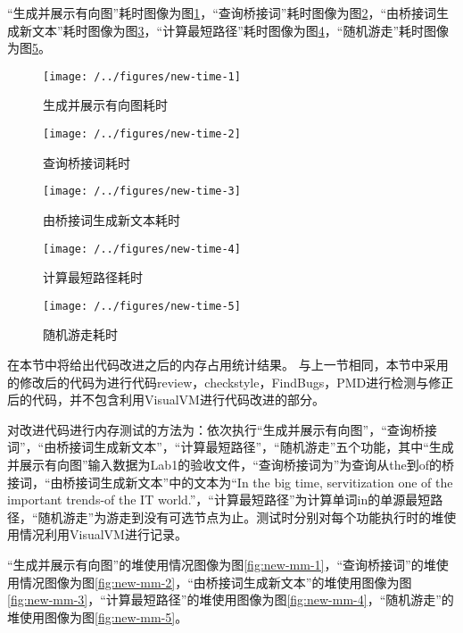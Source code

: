 “生成并展示有向图”耗时图像为图\ref{fig:new-time-1}，“查询桥接词”耗时图像为图\ref{fig:new-time-2}，“由桥接词生成新文本”耗时图像为图\ref{fig:new-time-3}，“计算最短路径”耗时图像为图\ref{fig:new-time-4}，“随机游走”耗时图像为图\ref{fig:new-time-5}。

\begin{figure}
\centering
\texttt{[image: /../figures/new-time-1]}
\caption{生成并展示有向图耗时}
\label{fig:new-time-1}
\end{figure}

\begin{figure}
\centering
\texttt{[image: /../figures/new-time-2]}
\caption{查询桥接词耗时}
\label{fig:new-time-2}
\end{figure}

\begin{figure}
\centering
\texttt{[image: /../figures/new-time-3]}
\caption{由桥接词生成新文本耗时}
\label{fig:new-time-3}
\end{figure}

\begin{figure}
\centering
\texttt{[image: /../figures/new-time-4]}
\caption{计算最短路径耗时}
\label{fig:new-time-4}
\end{figure}

\begin{figure}
\centering
\texttt{[image: /../figures/new-time-5]}
\caption{随机游走耗时}
\label{fig:new-time-5}
\end{figure}

在本节中将给出代码改进之后的内存占用统计结果。
与上一节相同，本节中采用的修改后的代码为进行代码review，checkstyle，FindBugs，PMD进行检测与修正后的代码，并不包含利用VisualVM进行代码改进的部分。

对改进代码进行内存测试的方法为：依次执行“生成并展示有向图”，“查询桥接词”，“由桥接词生成新文本”，“计算最短路径”，“随机游走”五个功能，其中“生成并展示有向图”输入数据为Lab1的验收文件，“查询桥接词为”为查询从the到of的桥接词，“由桥接词生成新文本”中的文本为“In the big time, servitization one of the important trends-of the IT world.”，“计算最短路径”为计算单词in的单源最短路径，“随机游走”为游走到没有可选节点为止。测试时分别对每个功能执行时的堆使用情况利用VisualVM进行记录。

“生成并展示有向图”的堆使用情况图像为图\ref{fig:new-mm-1}，“查询桥接词”的堆使用情况图像为图\ref{fig:new-mm-2}，“由桥接词生成新文本”的堆使用图像为图\ref{fig:new-mm-3}，“计算最短路径”的堆使用图像为图\ref{fig:new-mm-4}，“随机游走”的堆使用图像为图\ref{fig:new-mm-5}。

